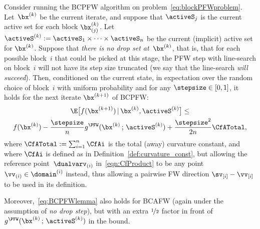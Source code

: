 \documentclass{article}
\begin{document}
\begin{lemma} \label{lem:BCPFWdescent}
Consider running the BCPFW algorithm on problem~\eqref{eq:blockPFWproblem}. Let~$\bx^{(k)}$ be the current iterate, and suppose that $\activeS_j$ is the current active set for each block $\bx_{(j)}^{(k)}$. Let $\activeS^{(k)} := \activeS_1 \times \cdots \times \activeS_n$ be the current (implicit) active set for $\bx^{(k)}$. Suppose that \emph{there is no drop set at~$\bx^{(k)}$}, that is, that for each possible block~$i$ that could be picked at this stage, the PFW step with line-search on block~$i$ will not have its step size truncated (we say that the line-search \emph{will succeed}). Then, conditioned on the current state,
in expectation over the random choice of block~$i$ with uniform probability and for any $\stepsize \in [0,1]$, it holds for the next iterate 
$\bx^{(k+1)}$ of BCPFW:
    \begin{multline}   \label{eq:BCPFWlemma}
    \E\big[ f(\bx^{(k+1)})\,|\, \bx^{(k)}, \activeS^{(k)} \big]
    \le \\ 
    f(\bx^{(k)}) -  \frac{\stepsize}{n} g^\PFW(\bx^{(k)} \,;\, \activeS^{(k)})
      + \frac{\stepsize^2}{2n} \CfATotal,
    \end{multline}
where $\CfATotal := \sum_{i=1}^n \CfAi$ is the total (away) curvature constant, and where $\CfAi$ is defined as in Definition~\ref{def:curvature_const}, but allowing the reference point~$\dualvarv_{(i)}$ in~\eqref{eqn:CfProduct} to be any point $\vv_{(i)} \in \domain^{(i)}$ instead, thus allowing a pairwise FW direction $\sv_{[i]} - \vv_{[i]}$ to be used in its definition.

Moreover,~\eqref{eq:BCPFWlemma} also holds for BCAFW (again under the assumption of \emph{no drop step}), but with an extra $\nicefrac{1}{2}$ factor in front of $g^\PFW(\bx^{(k)} \,;\, \activeS^{(k)})$ in the bound.
\end{lemma}
\end{document}
